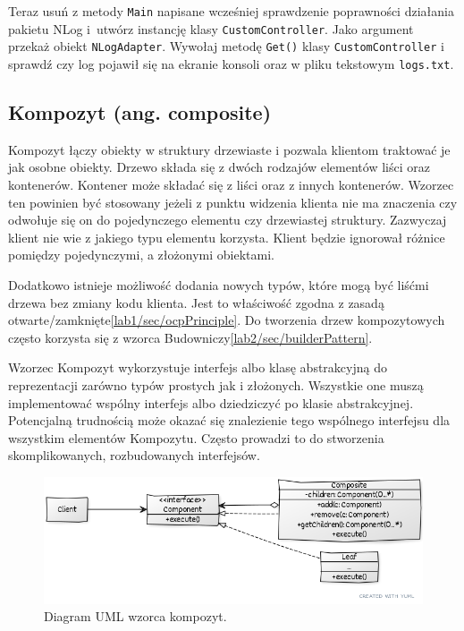 Teraz usuń z metody \texttt{Main} napisane wcześniej sprawdzenie poprawności działania pakietu NLog i~utwórz instancję klasy \texttt{CustomController}. Jako argument przekaż obiekt \texttt{NLogAdapter}. Wywołaj metodę \texttt{Get()} klasy \texttt{CustomController} i sprawdź czy log pojawił się na ekranie konsoli oraz w pliku tekstowym \texttt{logs.txt}.

\subsection{Kompozyt (ang. composite)}

Kompozyt łączy obiekty w struktury drzewiaste i pozwala klientom traktować je jak osobne obiekty. Drzewo składa się z dwóch rodzajów elementów liści oraz kontenerów. Kontener może składać się z liści oraz z innych kontenerów. Wzorzec ten powinien być stosowany jeżeli z punktu widzenia klienta nie ma znaczenia czy odwołuje się on do pojedynczego elementu czy drzewiastej struktury. Zazwyczaj klient nie wie z jakiego typu elementu korzysta. Klient będzie ignorował różnice pomiędzy pojedynczymi, a złożonymi obiektami.


Dodatkowo istnieje możliwość dodania nowych typów, które mogą być liśćmi drzewa bez zmiany kodu klienta. Jest to właściwość zgodna z zasadą otwarte/zamknięte\ref{lab1/sec/ocpPrinciple}. Do tworzenia drzew kompozytowych często korzysta się z wzorca Budowniczy\ref{lab2/sec/builderPattern}.


Wzorzec Kompozyt wykorzystuje interfejs albo klasę abstrakcyjną do reprezentacji zarówno typów prostych jak i złożonych. Wszystkie one muszą implementować wspólny interfejs albo dziedziczyć po klasie abstrakcyjnej. Potencjalną trudnością może okazać się znalezienie tego wspólnego interfejsu dla wszystkim elementów Kompozytu. Często prowadzi to do stworzenia skomplikowanych, rozbudowanych interfejsów.
 
\begin{figure}[hbt!]
	\centering
	\includegraphics[width=0.8\linewidth]{images/CompositeUml}
	\caption{Diagram UML wzorca kompozyt.}
	\label{lab3/fig/CompositeUml}
\end{figure}
%

